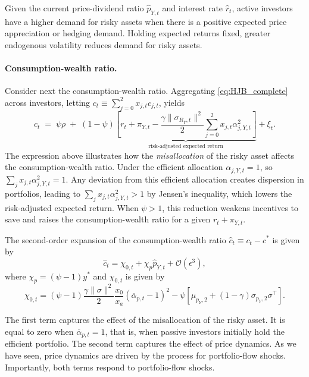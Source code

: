 \documentclass[12pt,english]{article}
\begin{document}
Given the current price-dividend ratio $\hat{p}_{Y,t}$ and interest rate $\hat{r}_t$, active investors have a higher demand for risky assets when there is a positive expected price appreciation or hedging demand.
Holding expected returns fixed, greater endogenous volatility reduces demand for risky assets.

\paragraph{Consumption-wealth ratio.} Consider next the consumption-wealth ratio.
Aggregating \eqref{eq:HJB_complete} across investors, letting $c_t \equiv \sum_{j=0}^2 x_{j,t} c_{j,t}$, yields
\begin{equation}
    c_t
    \;=\;
    \psi\rho
    \;+\;
    (1-\psi)\!
        \underbrace{\left[r_t+\pi_{Y,t}
        - \frac{\gamma\|\sigma_{R_Y,t}\|^2}{2}\sum_{j=0}^2 x_{j,t}\alpha_{j,Y,t}^2\right]}_{\text{risk-adjusted expected return}}
     + \xi_t.
\end{equation}
The expression above illustrates how the \textit{misallocation} of the risky asset affects the consumption-wealth ratio.
Under the efficient allocation $\alpha_{j,Y,t}=1$, so $\sum_{j} x_{j,t}\alpha_{j,Y,t}^2 = 1$. 
Any deviation from this efficient allocation creates dispersion in portfolios, leading to $\sum_j x_{j,t}\alpha_{j,Y,t}^2>1$ by Jensen’s inequality, which lowers the risk-adjusted expected return.
When $\psi>1$, this reduction weakens incentives to save and raises the consumption-wealth ratio for a given $r_t+\pi_{Y,t}$.  

The second-order expansion of the consumption-wealth ratio $\hat{c}_t \equiv c_t - c^{*}$ is given by
\begin{equation}
    \hat{c}_t = \chi_{0,t} + \chi_p \hat{p}_{Y,t} + \mathcal{O}(\epsilon^3),
\end{equation}
where $\chi_p = (\psi -1) y^* $ and $\chi_{0,t}$ is given by
\begin{equation}
    \chi_{0,t} = (\psi-1) \frac{\gamma\|\sigma\|^2}{2} \frac{x_0}{x_a}(\overline{\alpha}_{p,t}-1)^2 - \psi \left[ \mu_{p_Y,2} + (1-\gamma) \sigma_{p_Y,2} \sigma^\top \right].
\end{equation}

The first term captures the effect of the misallocation of the risky asset.
It is equal to zero when $\overline{\alpha}_{p,t}=1$, that is, when passive investors initially hold the efficient portfolio.
The second term captures the effect of price dynamics.
As we have seen, price dynamics are driven by the process for portfolio-flow shocks. 
Importantly, both terms respond to portfolio-flow shocks.
\end{document}
